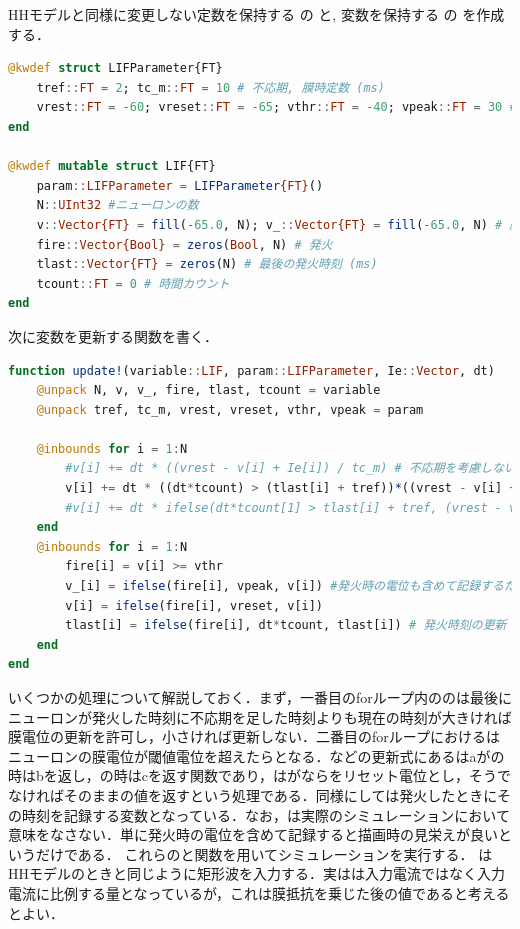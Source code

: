 HHモデルと同様に変更しない定数を保持する  の  と, 変数を保持する  の  を作成する．
\begin{lstlisting}[language=julia]
@kwdef struct LIFParameter{FT}
    tref::FT = 2; tc_m::FT = 10 # 不応期, 膜時定数 (ms)
    vrest::FT = -60; vreset::FT = -65; vthr::FT = -40; vpeak::FT = 30 #　静止膜電位, リセット電位, 閾値電位, ピーク電位 (mV)
end

@kwdef mutable struct LIF{FT}
    param::LIFParameter = LIFParameter{FT}()
    N::UInt32 #ニューロンの数
    v::Vector{FT} = fill(-65.0, N); v_::Vector{FT} = fill(-65.0, N) # 膜電位, 発火電位も記録する膜電位 (mV)
    fire::Vector{Bool} = zeros(Bool, N) # 発火
    tlast::Vector{FT} = zeros(N) # 最後の発火時刻 (ms)
    tcount::FT = 0 # 時間カウント
end
\end{lstlisting}
次に変数を更新する関数を書く．
\begin{lstlisting}[language=julia]
function update!(variable::LIF, param::LIFParameter, Ie::Vector, dt)
    @unpack N, v, v_, fire, tlast, tcount = variable
    @unpack tref, tc_m, vrest, vreset, vthr, vpeak = param
    
    @inbounds for i = 1:N
        #v[i] += dt * ((vrest - v[i] + Ie[i]) / tc_m) # 不応期を考慮しない場合の更新式
        v[i] += dt * ((dt*tcount) > (tlast[i] + tref))*((vrest - v[i] + Ie[i]) / tc_m)
        #v[i] += dt * ifelse(dt*tcount[1] > tlast[i] + tref, (vrest - v[i] + Ie[i]) / tc_m, 0)
    end
    @inbounds for i = 1:N
        fire[i] = v[i] >= vthr
        v_[i] = ifelse(fire[i], vpeak, v[i]) #発火時の電位も含めて記録するための変数 (除いてもよい)
        v[i] = ifelse(fire[i], vreset, v[i])        
        tlast[i] = ifelse(fire[i], dt*tcount, tlast[i]) # 発火時刻の更新
    end
end
\end{lstlisting}
いくつかの処理について解説しておく．まず，一番目のforループ内ののは最後にニューロンが発火した時刻に不応期を足した時刻よりも現在の時刻が大きければ膜電位の更新を許可し，小さければ更新しない．二番目のforループにおけるはニューロンの膜電位が閾値電位を超えたらとなる．などの更新式にあるはaがの時はbを返し，の時はcを返す関数であり，はがならをリセット電位とし，そうでなければそのままの値を返すという処理である．同様にしては発火したときにその時刻を記録する変数となっている．なお，は実際のシミュレーションにおいて意味をなさない．単に発火時の電位を含めて記録すると描画時の見栄えが良いというだけである．
これらのと関数を用いてシミュレーションを実行する． はHHモデルのときと同じように矩形波を入力する．実はは入力電流ではなく入力電流に比例する量となっているが，これは膜抵抗を乗じた後の値であると考えるとよい．
